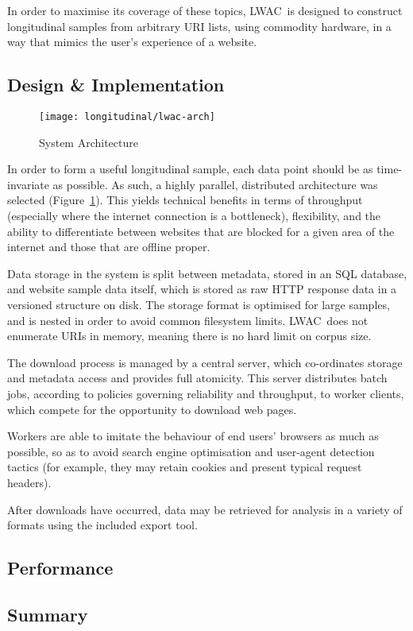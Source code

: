 In order to maximise its coverage of these topics, LWAC~is designed to construct longitudinal samples from arbitrary URI lists, using commodity hardware, in a way that mimics the user's experience of a website.  









\subsection{Design \& Implementation}


\begin{figure}[Ht]
    \centering
    \texttt{[image: longitudinal/lwac-arch]}
    \caption{System Architecture}
    \label{fig:longitudinal:lwac:arch}
\end{figure}

In order to form a useful longitudinal sample, each data point should be as time-invariate as possible.  As such, a highly parallel, distributed architecture was selected (Figure~\ref{fig:longitudinal:lwac:arch}).  This yields technical benefits in terms of throughput (especially where the internet connection is a bottleneck), flexibility, and the ability to differentiate between websites that are blocked for a given area of the internet and those that are offline proper.

Data storage in the system is split between metadata, stored in an SQL database, and website sample data itself, which is stored as raw HTTP response data in a versioned structure on disk.  The storage format is optimised for large samples, and is nested in order to avoid common filesystem limits.  LWAC~does not enumerate URIs in memory, meaning there is no hard limit on corpus size.

The download process is managed by a central server, which co-ordinates storage and metadata access and provides full atomicity.  This server distributes batch jobs, according to policies governing reliability and throughput, to worker clients, which compete for the opportunity to download web pages.

Workers are able to imitate the behaviour of end users' browsers as much as possible, so as to avoid search engine optimisation and user-agent detection tactics (for example, they may retain cookies and present typical request headers).

After downloads have occurred, data may be retrieved for analysis in a variety of formats using the included export tool.






\subsection{Performance}


\subsection{Summary}


